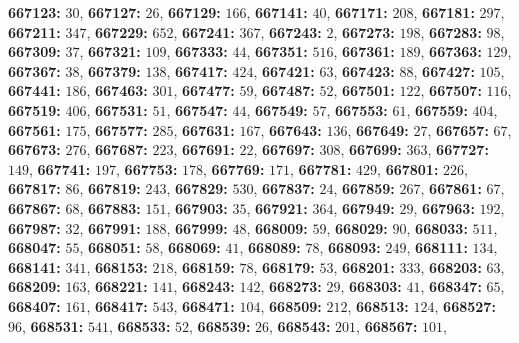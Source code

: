 \textsf{\bfseries 667123:} $30$, \textsf{\bfseries 667127:} $26$, \textsf{\bfseries 667129:} $166$, \textsf{\bfseries 667141:} $40$, \textsf{\bfseries 667171:} $208$, \textsf{\bfseries 667181:} $297$, \textsf{\bfseries 667211:} $347$, \textsf{\bfseries 667229:} $652$, \textsf{\bfseries 667241:} $367$, \textsf{\bfseries 667243:} $2$, \textsf{\bfseries 667273:} $198$, \textsf{\bfseries 667283:} $98$, \textsf{\bfseries 667309:} $37$, \textsf{\bfseries 667321:} $109$, \textsf{\bfseries 667333:} $44$, \textsf{\bfseries 667351:} $516$, \textsf{\bfseries 667361:} $189$, \textsf{\bfseries 667363:} $129$, \textsf{\bfseries 667367:} $38$, \textsf{\bfseries 667379:} $138$, \textsf{\bfseries 667417:} $424$, \textsf{\bfseries 667421:} $63$, \textsf{\bfseries 667423:} $88$, \textsf{\bfseries 667427:} $105$, \textsf{\bfseries 667441:} $186$, \textsf{\bfseries 667463:} $301$, \textsf{\bfseries 667477:} $59$, \textsf{\bfseries 667487:} $52$, \textsf{\bfseries 667501:} $122$, \textsf{\bfseries 667507:} $116$, \textsf{\bfseries 667519:} $406$, \textsf{\bfseries 667531:} $51$, \textsf{\bfseries 667547:} $44$, \textsf{\bfseries 667549:} $57$, \textsf{\bfseries 667553:} $61$, \textsf{\bfseries 667559:} $404$, \textsf{\bfseries 667561:} $175$, \textsf{\bfseries 667577:} $285$, \textsf{\bfseries 667631:} $167$, \textsf{\bfseries 667643:} $136$, \textsf{\bfseries 667649:} $27$, \textsf{\bfseries 667657:} $67$, \textsf{\bfseries 667673:} $276$, \textsf{\bfseries 667687:} $223$, \textsf{\bfseries 667691:} $22$, \textsf{\bfseries 667697:} $308$, \textsf{\bfseries 667699:} $363$, \textsf{\bfseries 667727:} $149$, \textsf{\bfseries 667741:} $197$, \textsf{\bfseries 667753:} $178$, \textsf{\bfseries 667769:} $171$, \textsf{\bfseries 667781:} $429$, \textsf{\bfseries 667801:} $226$, \textsf{\bfseries 667817:} $86$, \textsf{\bfseries 667819:} $243$, \textsf{\bfseries 667829:} $530$, \textsf{\bfseries 667837:} $24$, \textsf{\bfseries 667859:} $267$, \textsf{\bfseries 667861:} $67$, \textsf{\bfseries 667867:} $68$, \textsf{\bfseries 667883:} $151$, \textsf{\bfseries 667903:} $35$, \textsf{\bfseries 667921:} $364$, \textsf{\bfseries 667949:} $29$, \textsf{\bfseries 667963:} $192$, \textsf{\bfseries 667987:} $32$, \textsf{\bfseries 667991:} $188$, \textsf{\bfseries 667999:} $48$, \textsf{\bfseries 668009:} $59$, \textsf{\bfseries 668029:} $90$, \textsf{\bfseries 668033:} $511$, \textsf{\bfseries 668047:} $55$, \textsf{\bfseries 668051:} $58$, \textsf{\bfseries 668069:} $41$, \textsf{\bfseries 668089:} $78$, \textsf{\bfseries 668093:} $249$, \textsf{\bfseries 668111:} $134$, \textsf{\bfseries 668141:} $341$, \textsf{\bfseries 668153:} $218$, \textsf{\bfseries 668159:} $78$, \textsf{\bfseries 668179:} $53$, \textsf{\bfseries 668201:} $333$, \textsf{\bfseries 668203:} $63$, \textsf{\bfseries 668209:} $163$, \textsf{\bfseries 668221:} $141$, \textsf{\bfseries 668243:} $142$, \textsf{\bfseries 668273:} $29$, \textsf{\bfseries 668303:} $41$, \textsf{\bfseries 668347:} $65$, \textsf{\bfseries 668407:} $161$, \textsf{\bfseries 668417:} $543$, \textsf{\bfseries 668471:} $104$, \textsf{\bfseries 668509:} $212$, \textsf{\bfseries 668513:} $124$, \textsf{\bfseries 668527:} $96$, \textsf{\bfseries 668531:} $541$, \textsf{\bfseries 668533:} $52$, \textsf{\bfseries 668539:} $26$, \textsf{\bfseries 668543:} $201$, \textsf{\bfseries 668567:} $101$, 
